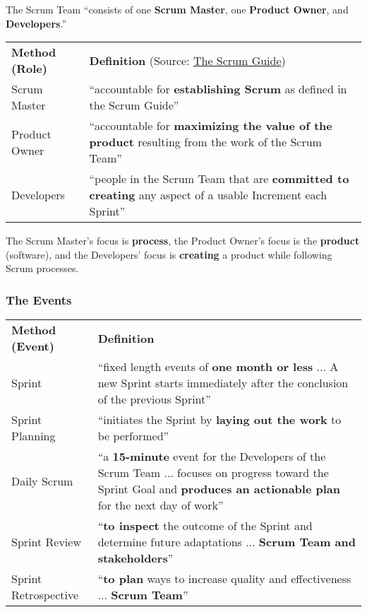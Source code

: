 The Scrum Team ``consists of one \textbf{Scrum Master}, one \textbf{Product Owner}, and \textbf{Developers}.''

\spacer
{}
\noindent\begin{tabular}{p{1.5in}|p{5in}}
\rowcolor{gray!35}
\textbf{Method (Role)} & \textbf{Definition} (Source: \href{https://www.scrumguides.org/scrum-guide.html}{The Scrum Guide})\\
Scrum Master & ``accountable for \textbf{establishing Scrum} as defined in the Scrum Guide'' \\
Product Owner\index{product owner} & ``accountable for \textbf{maximizing the value of the product} resulting from the work of the Scrum Team'' \\
Developers & ``people in the Scrum Team that are \textbf{committed to creating} any aspect of a usable Increment\index{scrum increment} each Sprint\index{sprint}''
\end{tabular}

\spacer
The Scrum Master's focus is \textbf{process}, the Product Owner's focus is the \textbf{product} (software), and the Developers' focus is \textbf{creating} a product while following Scrum processes.

\subsubsection{The Events}

\noindent\begin{tabular}{p{1.5in}|p{5in}}
\rowcolor{gray!35}
\textbf{Method (Event)} & \textbf{Definition}\\
Sprint\index{sprint} & ``fixed length events of \textbf{one month or less} ... A new Sprint starts immediately after the conclusion of the previous Sprint'' \\
Sprint Planning\index{sprint planning} & ``initiates the Sprint by \textbf{laying out the work} to be performed'' \\
Daily Scrum\index{daily scrum} & ``a \textbf{15-minute} event for the Developers of the Scrum Team ... focuses on progress toward the Sprint Goal\index{sprint goal} and \textbf{produces an actionable plan} for the next day of work'' \\
Sprint Review\index{sprint review} & ``\textbf{to inspect} the outcome of the Sprint and determine future adaptations ... \textbf{Scrum Team and stakeholders}'' \\
Sprint Retrospective\index{sprint retrospective} & ``\textbf{to plan} ways to increase quality and effectiveness ... \textbf{Scrum Team}''
\end{tabular}

